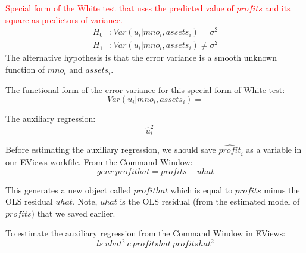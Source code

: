 \documentclass[12pt]{report}
\begin{document}
\noindent \textcolor{red}{Special form of the White test that uses the predicted value of $profits$ and its square as predictors of variance.} 
\begin{align*}
	H_0&: Var(u_i|mno_i,assets_i) = \sigma^2 \\
	H_1&: Var(u_i|mno_i,assets_i) \neq \sigma^2
\end{align*} The alternative hypothesis is that the error variance is a smooth unknown function of $mno_i$ and $assets_i$.

\noindent The functional form of the error variance for this special form of White test: $$Var(u_i|mno_i,assets_i) = $$

\noindent The auxiliary regression: $$\hat{u}^2_i = $$

\noindent Before estimating the auxiliary regression, we should save $\widehat{profit}_i$ as a variable in our EViews workfile. From the Command Window: $$genr\ profithat = profits-uhat$$
\begin{figure}[H]
	\centering
\end{figure}
\vspace{-\baselineskip} \noindent This generates a new object called $profithat$ which is equal to $profits$ minus the OLS residual $uhat$. Note, $uhat$ is the OLS residual (from the estimated model of $profits$) that we saved earlier.
\begin{figure}[H]
	\centering
\end{figure}
\vspace{-\baselineskip} \noindent To estimate the auxiliary regression from the Command Window in EViews: $$ls\ uhat^2\ c\ profitshat\ profitshat^2$$
\begin{figure}[H]
	\centering
\end{figure}
\vspace{-\baselineskip}
\end{document}
